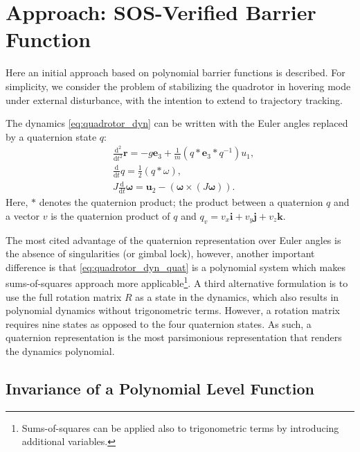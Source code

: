 \documentclass[conference]{IEEEtran}
\begin{document}
\section{Approach: SOS-Verified Barrier Function}

Here an initial approach based on polynomial barrier functions is described. For simplicity, we consider the problem of stabilizing the quadrotor in hovering mode under external disturbance, with the intention to extend to trajectory tracking.

The dynamics \eqref{eq:quadrotor_dyn} can be written with the Euler angles replaced by a quaternion state $q$:
\begin{equation}
\label{eq:quadrotor_dyn_quat}
\begin{aligned}
  & \frac{\mathrm{d}^2}{\mathrm{d}t^2} \mathbf{r} =  -g \mathbf{e}_3 + \frac{1}{m} (q * \mathbf{e}_3 * q^{-1}) u_1, \\
  & \frac{\mathrm{d}}{\mathrm{d}t} q
   = \frac{1}{2} (q * \omega), \\
  & J \frac{\mathrm{d}}{\mathrm{d}t} \mathbf{\omega} = \mathbf{u}_2 - (\mathbf{\omega} \times (J \mathbf{\omega})).
\end{aligned}
\end{equation}
Here, $*$ denotes the quaternion product; the product between a quaternion $q$ and a vector $v$ is the quaternion product of $q$ and $q_v = v_x \mathbf{i} + v_y \mathbf{j} + v_z \mathbf{k}$.

The most cited advantage of the quaternion representation over Euler angles is the absence of singularities (or gimbal lock), however, another important difference is that \eqref{eq:quadrotor_dyn_quat} is a polynomial system which makes sums-of-squares approach more applicable\footnote{Sums-of-squares can be applied also to trigonometric terms by introducing additional variables.}. A third alternative formulation is to use the full rotation matrix $R$ as a state in the dynamics, which also results in polynomial dynamics without trigonometric terms. However, a rotation matrix requires nine states as opposed to the four quaternion states. As such, a quaternion representation is the most parsimonious representation that renders the dynamics polynomial.

\subsection{Invariance of a Polynomial Level Function}
\end{document}
